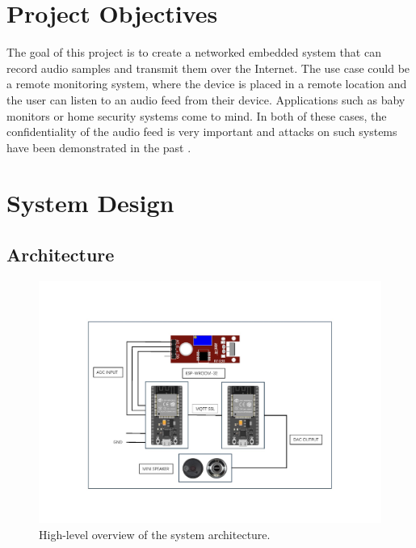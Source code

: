 \documentclass[conference]{IEEEtran}
\begin{document}
\section{Project Objectives} %
\label{sec:background}

The goal of this project is to create a networked embedded system that can record audio samples and transmit them over the Internet.
The use case could be a remote monitoring system, where the device is placed in a remote location and 
the user can listen to an audio feed from their device. Applications such as baby monitors or home security systems come to mind.
In both of these cases, the confidentiality of the audio feed is very important and
attacks on such systems have been demonstrated in the past \cite{BabyMonitorHack, VideoSurvAttacks}.

\section{System Design}
\label{sec:system_design}

\subsection{Architecture}

\begin{figure}[h]
    \hspace*{-0.4cm}
    \includegraphics[width=1.2\linewidth]{assets/diagram.png}
    \vspace{-1.5cm}
    \caption{High-level overview of the system architecture.}
    \label{fig:architecture}
\end{figure}
\end{document}
